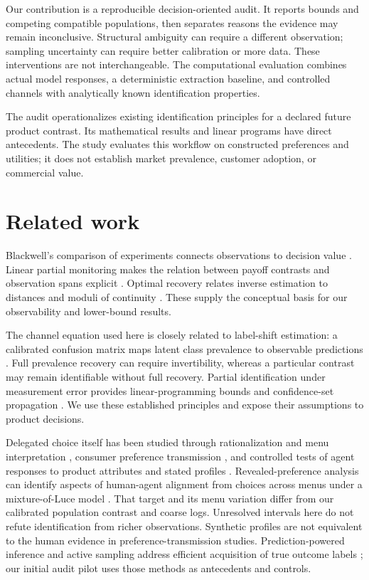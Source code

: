 \documentclass[10pt,twocolumn]{article}
\theoremstyle{definition}\newtheorem{definition}[theorem]{Definition}
\newcommand{\1}{\mathbf 1}
\begin{document}
Our contribution is a reproducible decision-oriented audit. It reports bounds and competing compatible populations, then separates reasons the evidence may remain inconclusive. Structural ambiguity can require a different observation; sampling uncertainty can require better calibration or more data. These interventions are not interchangeable. The computational evaluation combines actual model responses, a deterministic extraction baseline, and controlled channels with analytically known identification properties.

The audit operationalizes existing identification principles for a declared future product contrast. Its mathematical results and linear programs have direct antecedents. The study evaluates this workflow on constructed preferences and utilities; it does not establish market prevalence, customer adoption, or commercial value.

\section{Related work}
Blackwell's comparison of experiments connects observations to decision value \citep{blackwell1953}. Linear partial monitoring makes the relation between payoff contrasts and observation spans explicit \citep{kirschner2023}. Optimal recovery relates inverse estimation to distances and moduli of continuity \citep{donoho1994}. These supply the conceptual basis for our observability and lower-bound results.

The channel equation used here is closely related to label-shift estimation: a calibrated confusion matrix maps latent class prevalence to observable predictions \citep{lipton2018}. Full prevalence recovery can require invertibility, whereas a particular contrast may remain identifiable without full recovery. Partial identification under measurement error provides linear-programming bounds and confidence-set propagation \citep{finkelstein2021}. We use these established principles and expose their assumptions to product decisions.

Delegated choice itself has been studied through rationalization and menu interpretation \citep{kops2026}, consumer preference transmission \citep{kraft2026}, and controlled tests of agent responses to product attributes and stated profiles \citep{cherep2025}. Revealed-preference analysis can identify aspects of human-agent alignment from choices across menus under a mixture-of-Luce model \citep{suleymanov2026}. That target and its menu variation differ from our calibrated population contrast and coarse logs. Unresolved intervals here do not refute identification from richer observations. Synthetic profiles are not equivalent to the human evidence in preference-transmission studies. Prediction-powered inference and active sampling address efficient acquisition of true outcome labels \citep{ppi2023,asi2024,robust2025}; our initial audit pilot uses those methods as antecedents and controls.
\end{document}
